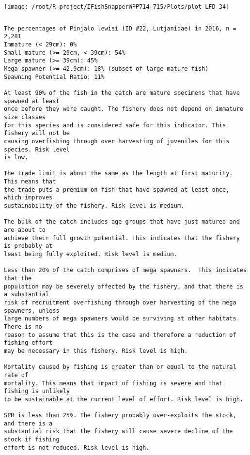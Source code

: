 \documentclass{report}\usepackage[]{graphicx}\usepackage[]{color}
\makeatletter
\def\maxwidth{ %
  \ifdim\Gin@nat@width>\linewidth
    \linewidth
  \else
    \Gin@nat@width
  \fi
}
\newenvironment{kframe}{%
 \def\at@end@of@kframe{}%
 \ifinner\ifhmode%
  \def\at@end@of@kframe{\end{minipage}}%
  \begin{minipage}{\columnwidth}%
 \fi\fi%
 \def\FrameCommand##1{\hskip\@totalleftmargin \hskip-\fboxsep
 \colorbox{shadecolor}{##1}\hskip-\fboxsep
     \hskip-\linewidth \hskip-\@totalleftmargin \hskip\columnwidth}%
 \MakeFramed {\advance\hsize-\width
   \@totalleftmargin\z@ \linewidth\hsize
   \@setminipage}}%
 {\par\unskip\endMakeFramed%
 \at@end@of@kframe}
\newenvironment{knitrout}{}{} %
\makeatother
\begin{document}
\begin{knitrout}
\texttt{[image: /root/R-project/IFishSnapperWPP714\_715/Plots/plot-LFD-34]} 
\begin{kframe}\begin{verbatim}
\end{verbatim}
\end{kframe}
\clearpage
\newpage
\begin{kframe}\begin{verbatim}The percentages of Pinjalo lewisi (ID #22, Lutjanidae) in 2016, n = 2,281
Immature (< 29cm): 0%
Small mature (>= 29cm, < 39cm): 54%
Large mature (>= 39cm): 45%
Mega spawner (>= 42.9cm): 18% (subset of large mature fish)
Spawning Potential Ratio: 11%
 
At least 90% of the fish in the catch are mature specimens that have spawned at least
once before they were caught. The fishery does not depend on immature size classes
for this species and is considered safe for this indicator. This fishery will not be
causing overfishing through over harvesting of juveniles for this species. Risk level
is low.

The trade limit is about the same as the length at first maturity.  This means that
the trade puts a premium on fish that have spawned at least once, which improves
sustainability of the fishery. Risk level is medium.

The bulk of the catch includes age groups that have just matured and are about to
achieve their full growth potential. This indicates that the fishery is probably at
least being fully exploited. Risk level is medium.

Less than 20% of the catch comprises of mega spawners.  This indicates that the
population may be severely affected by the fishery, and that there is a substantial
risk of recruitment overfishing through over harvesting of the mega spawners, unless
large numbers of mega spawners would be surviving at other habitats. There is no
reason to assume that this is the case and therefore a reduction of fishing effort
may be necessary in this fishery. Risk level is high.
 
Mortality caused by fishing is greater than or equal to the natural rate of
mortality. This means that impact of fishing is severe and that fishing is unlikely
to be sustainable at the current level of effort. Risk level is high.
 
SPR is less than 25%. The fishery probably over-exploits the stock, and there is a
substantial risk that the fishery will cause severe decline of the stock if fishing
effort is not reduced. Risk level is high.
 

\end{verbatim}
\end{kframe}
\end{knitrout}
\end{document}
